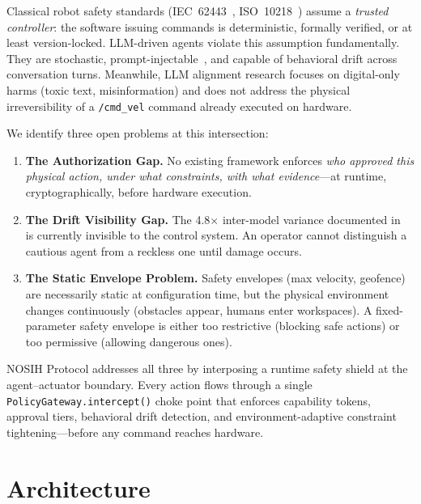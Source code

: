 \documentclass[conference]{IEEEtran}
\begin{document}
Classical robot safety standards (IEC~62443~\cite{iec62443}, ISO~10218~\cite{iso10218})
assume a \emph{trusted controller}: the software issuing commands is deterministic,
formally verified, or at least version-locked.
LLM-driven agents violate this assumption fundamentally.
They are stochastic, prompt-injectable~\cite{owasp-asi}, and capable of behavioral
drift across conversation turns.
Meanwhile, LLM alignment research focuses on digital-only harms (toxic text,
misinformation) and does not address the physical irreversibility of a
\texttt{/cmd\_vel} command already executed on hardware.

We identify three open problems at this intersection:

\begin{enumerate}
  \item \textbf{The Authorization Gap.}
  No existing framework enforces \emph{who approved this physical action, under
  what constraints, with what evidence}---at runtime, cryptographically, before
  hardware execution.

  \item \textbf{The Drift Visibility Gap.}
  The 4.8$\times$ inter-model variance documented in~\cite{rosclaw} is currently
  invisible to the control system.
  An operator cannot distinguish a cautious agent from a reckless one until
  damage occurs.

  \item \textbf{The Static Envelope Problem.}
  Safety envelopes (max velocity, geofence) are necessarily static at
  configuration time, but the physical environment changes continuously
  (obstacles appear, humans enter workspaces).
  A fixed-parameter safety envelope is either too restrictive (blocking safe
  actions) or too permissive (allowing dangerous ones).
\end{enumerate}

NOSIH Protocol addresses all three by interposing a runtime safety shield at the
agent--actuator boundary.
Every action flows through a single \texttt{PolicyGateway.intercept()} choke point
that enforces capability tokens, approval tiers, behavioral drift detection, and
environment-adaptive constraint tightening---before any command reaches hardware.

\section{Architecture}
\label{sec:arch}
\end{document}
